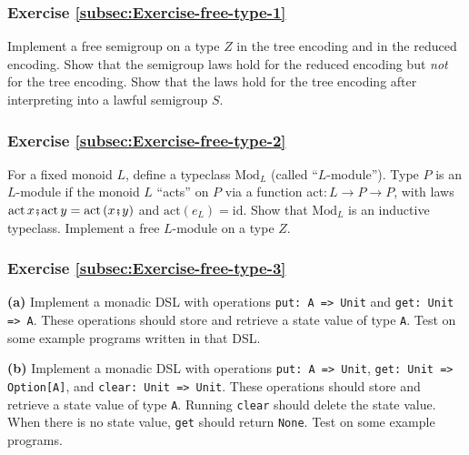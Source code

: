 \subsubsection{Exercise \label{subsec:Exercise-free-type-1}\ref{subsec:Exercise-free-type-1}}

Implement a free semigroup on a type $Z$ in the tree encoding and
in the reduced encoding. Show that the semigroup laws hold for the
reduced encoding but \emph{not} for the tree encoding. Show that the
laws hold for the tree encoding after interpreting into a lawful semigroup
$S$.

\subsubsection{Exercise \label{subsec:Exercise-free-type-2}\ref{subsec:Exercise-free-type-2}}

For a fixed monoid $L$, define a typeclass $\text{Mod}_{L}$ (called
\textsf{``}$L$-module\textsf{''}). Type $P$ is an $L$-module if the monoid $L$
\textsf{``}acts\textsf{''} on $P$ via a function act$:L\rightarrow P\rightarrow P$,
with laws $\text{act}\,x\bef\text{act}\,y=\text{act}\left(x\bef y\right)$
and $\text{act}\left(e_{L}\right)=\text{id}$. Show that $\text{Mod}_{L}$
is an inductive typeclass. Implement a free $L$-module on a type
$Z$. 

\subsubsection{Exercise \label{subsec:Exercise-free-type-3}\ref{subsec:Exercise-free-type-3}}

\textbf{(a)} Implement a monadic DSL with operations \lstinline!put: A => Unit!
and \lstinline!get: Unit => A!.
These operations should store and retrieve a state value of type \lstinline!A!.
Test on some example programs written in that DSL. 

\textbf{(b)} Implement a monadic DSL with operations \lstinline!put: A => Unit!,
\lstinline!get: Unit => Option[A]!,
and \lstinline!clear: Unit => Unit!.
These operations should store and retrieve a state value of type \lstinline!A!.
Running \lstinline!clear!
should delete the state value. When there is no state value, \lstinline!get!
should return \lstinline!None!.
Test on some example programs.

